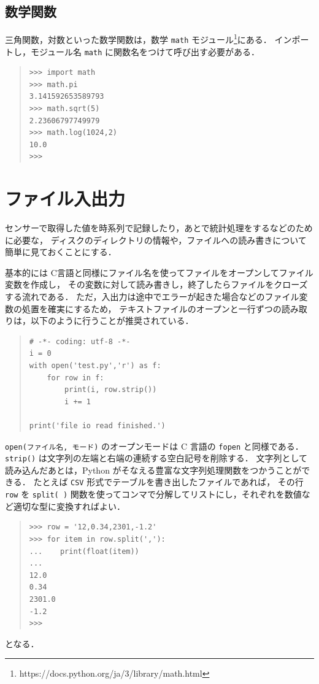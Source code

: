 \documentclass[11pt,a4,epsf]{report}
\begin{document}
\subsection{数学関数}

三角関数，対数といった数学関数は，数学 \verb+math+ モジュール\footnote{https://docs.python.org/ja/3/library/math.html}にある．
インポートし，モジュール名 \verb+math+ に関数名をつけて呼び出す必要がある．
\begin{quote}
\small
\begin{verbatim}
>>> import math
>>> math.pi
3.141592653589793
>>> math.sqrt(5)
2.23606797749979
>>> math.log(1024,2)
10.0
>>> 
\end{verbatim}
\end{quote}


\section{ファイル入出力}

センサーで取得した値を時系列で記録したり，あとで統計処理をするなどのために必要な，
ディスクのディレクトリの情報や，ファイルへの読み書きについて簡単に見ておくことにする．

基本的には C言語と同様にファイル名を使ってファイルをオープンしてファイル変数を作成し，
その変数に対して読み書きし，終了したらファイルをクローズする流れである．
ただ，入出力は途中でエラーが起きた場合などのファイル変数の処置を確実にするため，
テキストファイルのオープンと一行ずつの読み取りは，以下のように行うことが推奨されている．
\begin{quote}
\small
\begin{verbatim}
# -*- coding: utf-8 -*-
i = 0
with open('test.py','r') as f:
    for row in f:
        print(i, row.strip())
        i += 1

print('file io read finished.')
\end{verbatim}
\end{quote}
\verb+open(ファイル名, モード)+ のオープンモードは C 言語の \verb+fopen+ と同様である．
\verb+strip()+ は文字列の左端と右端の連続する空白記号を削除する．
文字列として読み込んだあとは，Python がそなえる豊富な文字列処理関数をつかうことができる．
たとえば \verb+CSV+ 形式でテーブルを書き出したファイルであれば，
その行 \verb+row+ を \verb+split( )+ 関数を使ってコンマで分解してリストにし，それぞれを数値など適切な型に変換すればよい．
\begin{quote}
\small
\begin{verbatim}
>>> row = '12,0.34,2301,-1.2'
>>> for item in row.split(','):
...    print(float(item))
...
12.0
0.34
2301.0
-1.2
>>>
\end{verbatim}
\end{quote}
となる．
\end{document}

